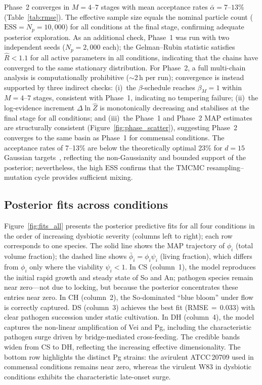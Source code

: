 \documentclass[11pt,a4paper]{article}
\begin{document}
Phase~2 converges in $M=4$--$7$ stages with mean acceptance rates $\bar{\alpha}=7$--$13$\% (Table~\ref{tab:rmse}).
The effective sample size equals the nominal particle count ($\mathrm{ESS}=N_p=10{,}000$) for all conditions at the final stage, confirming adequate posterior exploration.
As an additional check, Phase~1 was run with two independent seeds ($N_p=2{,}000$ each); the Gelman--Rubin statistic satisfies $\hat{R}<1.1$ for all active parameters in all conditions, indicating that the chains have converged to the same stationary distribution.
For Phase~2, a full multi-chain analysis is computationally prohibitive ($\sim$2\,h per run); convergence is instead supported by three indirect checks: (i)~the $\beta$-schedule reaches $\beta_M=1$ within $M=4$--$7$ stages, consistent with Phase~1, indicating no tempering failure; (ii)~the log-evidence increment $\Delta\ln\hat{Z}$ is monotonically decreasing and stabilises at the final stage for all conditions; and (iii)~the Phase~1 and Phase~2 MAP estimates are structurally consistent (Figure~\ref{fig:phase_scatter}), suggesting Phase~2 converges to the same basin as Phase~1 for commensal conditions.
The acceptance rates of 7--13\% are below the theoretically optimal 23\% for $d=15$ Gaussian targets~\cite{RobertsRosenthal2001Optimal}, reflecting the non-Gaussianity and bounded support of the posterior; nevertheless, the high ESS confirms that the TMCMC resampling--mutation cycle provides sufficient mixing.

\subsection{Posterior fits across conditions}

Figure~\ref{fig:fits_all} presents the posterior predictive fits for all four conditions in the order of increasing dysbiotic severity (columns left to right); each row corresponds to one species.
The solid line shows the MAP trajectory of $\phi_i$ (total volume fraction); the dashed line shows $\bar{\phi}_i=\phi_i\psi_i$ (living fraction), which differs from $\phi_i$ only where the viability $\psi_i<1$.
In CS (column~1), the model reproduces the initial rapid growth and steady state of So and An; pathogen species remain near zero---not due to locking, but because the posterior concentrates these entries near zero.
In CH (column~2), the So-dominated ``blue bloom'' under flow is correctly captured.
DS (column~3) achieves the best fit (RMSE\,$=$\,0.033) with clear pathogen succession under static cultivation.
In DH (column~4), the model captures the non-linear amplification of Vei and Pg, including the characteristic pathogen surge driven by bridge-mediated cross-feeding.
The credible bands widen from CS to DH, reflecting the increasing effective dimensionality.
The bottom row highlights the distinct Pg strains: the avirulent ATCC\,20709 used in commensal conditions remains near zero, whereas the virulent W83 in dysbiotic conditions exhibits the characteristic late-onset surge.
\end{document}
